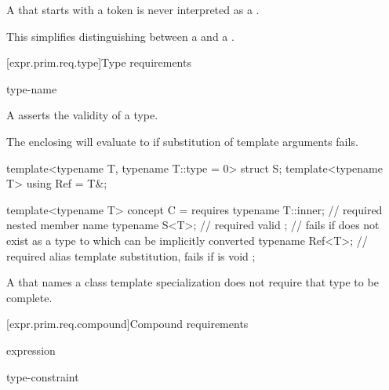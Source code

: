 \pnum
A  that starts with a  token
is never interpreted as a .
\begin{note}
This simplifies distinguishing between a 
and a .
\end{note}

[expr.prim.req.type]{Type requirements}
%

\begin{bnf}
\br
      type-name \terminal{;}
\end{bnf}

\pnum
A  asserts the validity of a type.
\begin{note}
The enclosing  will evaluate to 
if substitution of template arguments fails.
\end{note}
\begin{example}
\begin{codeblock}
template<typename T, typename T::type = 0> struct S;
template<typename T> using Ref = T&;

template<typename T> concept C = requires {
  typename T::inner;    // required nested member name
  typename S<T>;        // required valid ;
                        // fails if  does not exist as a type to which  can be implicitly converted
  typename Ref<T>;      // required alias template substitution, fails if  is void
};
\end{codeblock}
\end{example}

\pnum
A  that names a class template specialization
does not require that type to be complete.

[expr.prim.req.compound]{Compound requirements}
%

\begin{bnf}
\br
    \terminal{\{} expression \terminal{\}}   \terminal{;}
\end{bnf}

\begin{bnf}
\br
    \terminal{->} type-constraint
\end{bnf}

